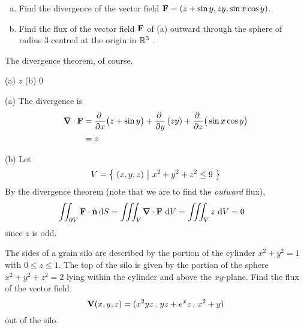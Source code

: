 \begin{question}[M317 2012D] %

\begin{enumerate}[(a)]
\item
Find the divergence of the vector field $\mathbf{F} = (z + \sin y, zy, \sin x \cos y)$.
\item
Find the flux of the vector field $\mathbf{F}$ of (a) outward through the sphere of 
radius $3$ centred at the origin in $\mathbb{R}^3$ .
\end{enumerate}
\end{question}

\begin{hint} 
The divergence theorem, of course.
\end{hint}

\begin{answer} 
(a) $z$\qquad
(b) $0$
\end{answer}

\begin{solution} (a)
The divergence is
\begin{align*}
\vnabla\cdot\vF &= 
    \pdiff{}{x}\big(z+\sin y\big)
     +\pdiff{}{y}\left(zy\right)
     +\pdiff{}{z}\big(\sin x\cos y\big) \\
   &=   z
\end{align*}

\noindent (b) Let
\begin{align*}
V=\big\{ \ (x,y,z)\ \big|\ x^2+y^2+z^2\le 9\ \big\}
\end{align*}
By the divergence theorem (note that we are to find the \emph{outward} 
flux),
\begin{align*}
\dblInt_{\partial V}  \vF\cdot\hn\,\dee{S}
&= \tripInt_V \vnabla\cdot \vF\ \dee{V} 
= \tripInt_V z\ \dee{V} 
= 0
\end{align*}
since $z$ is odd.
\end{solution}

\begin{question}
The sides of a grain silo are described by the portion of the 
cylinder $x^2 + y^2 = 1$ with $0 \le z\le 1$. The top of the silo is 
given by the portion of the sphere $x^2+ y^2+ z^2 = 2$ lying within the 
cylinder and above the $xy$-plane. Find the flux of the vector field
\begin{equation*}
\mathbf{V}(x,y,z) = (x^2yz\,,\, yz+e^xz\,,\, x^2+y ) 
\end{equation*}
out of the silo. 
\end{question}

